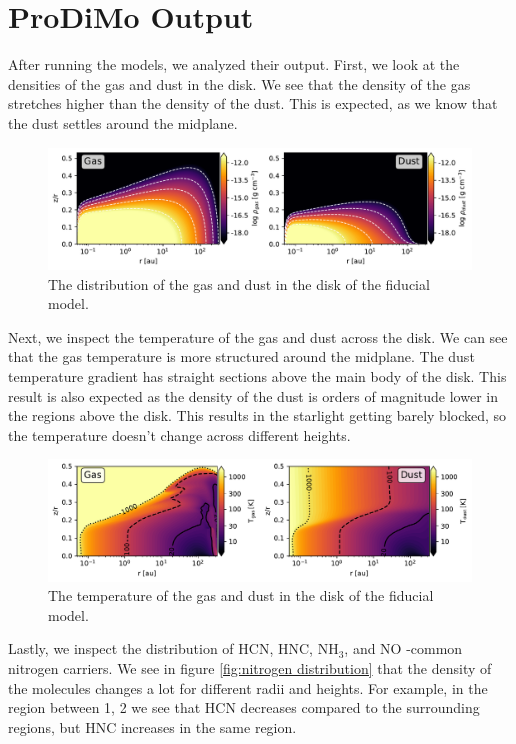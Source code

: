 \documentclass[twoside, single, authoryear, semicolon]{lion-msc}
\newcommand{\4}{$_4$}
\newcommand{\3}{$_3$}
\newcommand{\2}{$_2$}
\begin{document}
\section{ProDiMo Output}
After running the models, we analyzed their output. First, we look at the densities of the gas and dust in the disk. We see that the density of the gas stretches higher than the density of the dust. This is expected, as we know that the dust settles around the midplane. 

\begin{figure}[!ht]
    \centering
    \includegraphics[width=\linewidth]{Figures/Density.pdf}
    \caption{The distribution of the gas and dust in the disk of the fiducial model.}
    \label{fig:density}
\end{figure}

Next, we inspect the temperature of the gas and dust across the disk. We can see that the gas temperature is more structured around the midplane. The dust temperature gradient has straight sections above the main body of the disk. This result is also expected as the density of the dust is orders of magnitude lower in the regions above the disk. This results in the starlight getting barely blocked, so the temperature doesn't change across different heights.

\begin{figure}[!ht]
    \centering
    \includegraphics[width=\linewidth]{Figures/Temperature.pdf}
    \caption{The temperature of the gas and dust in the disk of the fiducial model.}
    \label{fig:temperature}
\end{figure}

Lastly, we inspect the distribution of HCN, HNC, NH\3, and NO -common nitrogen carriers. We see in figure \ref{fig:nitrogen distribution} that the density of the molecules changes a lot for different radii and heights. For example, in the region between 1, 2 we see that HCN decreases compared to the surrounding regions, but HNC increases in the same region. 
\end{document}
